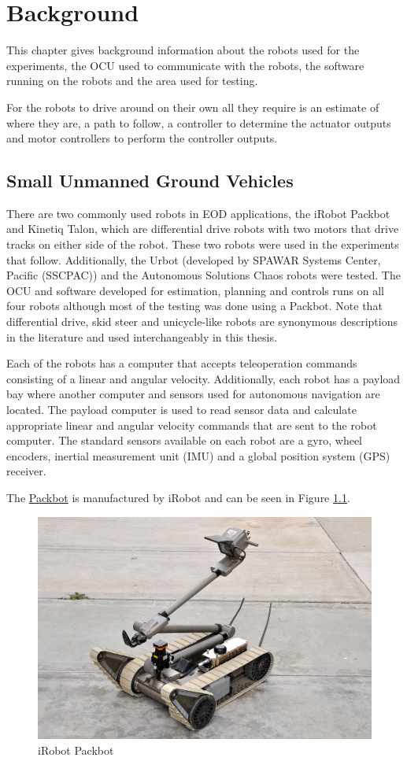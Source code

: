 \chapter{Background}
\label{ch:background}
This chapter gives background information about the robots used for the experiments, the OCU used to communicate with the robots, the software running on the robots and the area used for testing.

For the robots to drive around on their own all they require is an estimate of where they are, a path to follow, a controller to determine the actuator outputs and motor controllers to perform the controller outputs.

\section{Small Unmanned Ground Vehicles}
\label{sec:smallugvs}
There are two commonly used robots in EOD applications, the iRobot Packbot and Kinetiq Talon, which are differential drive robots with two motors that drive tracks on either side of the robot. These two robots were used in the experiments that follow. Additionally, the Urbot (developed by SPAWAR Systems Center, Pacific (SSCPAC)) and the Autonomous Solutions Chaos robots were tested. The OCU and software developed for estimation, planning and controls runs on all four robots although most of the testing was done using a Packbot. Note that differential drive, skid steer and unicycle-like robots are synonymous descriptions in the literature and used interchangeably in this thesis.

Each of the robots has a computer that accepts teleoperation commands consisting of a linear and angular velocity. Additionally, each robot has a payload bay where another computer and sensors used for autonomous navigation are located. The payload computer is used to read sensor data and calculate appropriate linear and angular velocity commands that are sent to the robot computer. The standard sensors available on each robot are a gyro, wheel encoders, inertial measurement unit (IMU) and a global position system (GPS) receiver.

The \href{http://www.irobot.com/sp.cfm?pageid=171}{Packbot} is manufactured by iRobot and can be seen in Figure \ref{fig:packbot}.

\begin{figure}[ht!]
	\centering
	\includegraphics[width=.3\textwidth]{images/packbotRetrotraverse}
	\caption{iRobot Packbot}
	\label{fig:packbot}
\end{figure}


